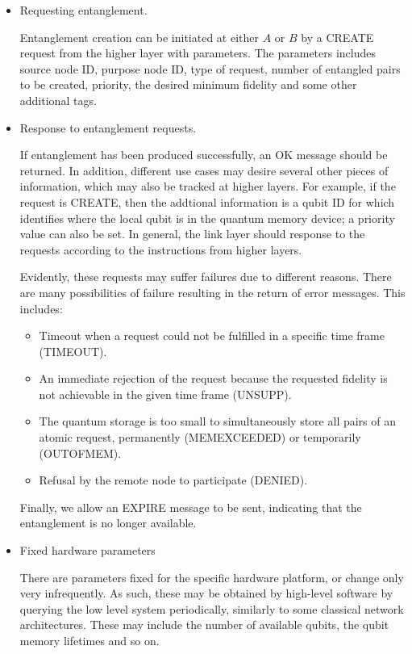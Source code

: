\documentclass[10pt]{article}
\begin{document}
\begin{itemize}
    \item Requesting entanglement.
    
    Entanglement creation
    can be initiated at either $A$ or $B$ by a CREATE request from
    the higher layer with parameters. The parameters includes source node ID, purpose node ID, type of request, number of entangled pairs to be created, priority, the desired minimum
    fidelity and some other additional tags. 

    \item Response to entanglement requests.
    
    If entanglement has been produced successfully, an OK message should be returned. In addition, different use cases may desire several other pieces of information, which may also be tracked at higher layers. For example, if the request is CREATE, then the addtional information is a qubit ID for which identifies where the local qubit is in the quantum memory device; a priority value can also be set. In general, the link layer should response to the requests according to the instructions from higher layers.


    Evidently, these requests may suffer failures due to different reasons. There are many possibilities of failure resulting in the return of error messages. This includes:
    \begin{itemize}
        \item Timeout when a request could not be fulfilled in a specific time frame (TIMEOUT).
        \item An immediate rejection of the request because the requested fidelity is not achievable in the given time frame (UNSUPP).
        
        \item The quantum storage is too small to simultaneously store all pairs of an atomic request, permanently (MEMEXCEEDED) or temporarily (OUTOFMEM).
        
        \item Refusal by the remote node to participate (DENIED).
    \end{itemize}

    Finally, we allow an EXPIRE message to be sent, indicating that the entanglement is no longer available.

\item Fixed hardware parameters

There are parameters fixed for the specific hardware platform, or change only very infrequently. As such, these may be obtained by high-level software by querying the low level system periodically, similarly to some classical network architectures. These may include the number of available qubits, the qubit memory lifetimes and so on.

\end{itemize}
\end{document}
